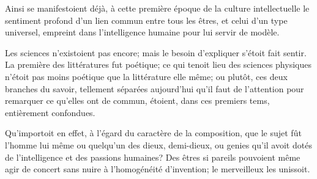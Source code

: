 \documentclass[11pt,a4paper]{article}
\begin{document}
Ainsi se manifestoient  déjà, à cette première époque de
la culture intellectuelle  le sentiment
 profond d'un lien commun entre tous les êtres, et celui
d'un type universel, empreint dans l'intelligence humaine pour lui
servir de  modèle.

Les sciences n'existoient pas encore; mais le besoin d'expliquer
s'étoit fait sentir. La première des littératures fut poétique; ce qui
tenoit lieu des sciences physiques n'étoit pas moins poétique que la
littérature elle même; ou plutôt, ces deux branches du savoir,
 tellement séparées aujourd'hui qu'il faut de
l'attention pour remarquer ce qu'elles ont de commun, étoient, dans ces
premiers tems,  entièrement confondues.

Qu'importoit en effet, à l'égard du caractère de la composition, que
le sujet fût l'homme lui même ou quelqu'un des dieux, demi-dieux, ou
genies qu'il avoit dotés de l'intelligence et des passions humaines?
Des êtres si pareils pouvoient même agir de concert sans nuire à
l'homogénéité d'invention; le merveilleux les unissoit.
\end{document}
